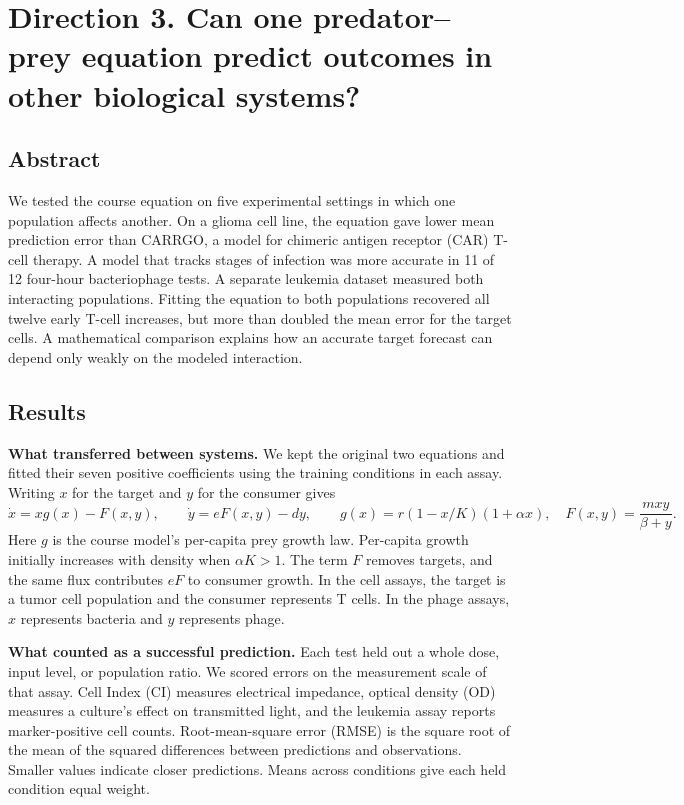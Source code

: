\section*{Direction 3. Can one predator--prey equation predict outcomes in other biological systems?}

\subsection*{Abstract}
We tested the course equation on five experimental settings in which one population affects another. On a glioma cell line, the equation gave lower mean prediction error than CARRGO, a model for chimeric antigen receptor (CAR) T-cell therapy. A model that tracks stages of infection was more accurate in 11 of 12 four-hour bacteriophage tests. A separate leukemia dataset measured both interacting populations. Fitting the equation to both populations recovered all twelve early T-cell increases, but more than doubled the mean error for the target cells. A mathematical comparison explains how an accurate target forecast can depend only weakly on the modeled interaction.

\subsection*{Results}
\textbf{What transferred between systems.}
We kept the original two equations and fitted their seven positive coefficients using the training conditions in each assay. Writing $x$ for the target and $y$ for the consumer gives
\[
 \dot x=xg(x)-F(x,y),\qquad \dot y=eF(x,y)-dy,\qquad
 g(x)=r(1-x/K)(1+\alpha x),\quad F(x,y)=\frac{mxy}{\beta+y}.
\]
Here $g$ is the course model's per-capita prey growth law. Per-capita growth initially increases with density when $\alpha K>1$. The term $F$ removes targets, and the same flux contributes $eF$ to consumer growth. In the cell assays, the target is a tumor cell population and the consumer represents T cells. In the phage assays, $x$ represents bacteria and $y$ represents phage.

\textbf{What counted as a successful prediction.}
Each test held out a whole dose, input level, or population ratio. We scored errors on the measurement scale of that assay. Cell Index (CI) measures electrical impedance, optical density (OD) measures a culture's effect on transmitted light, and the leukemia assay reports marker-positive cell counts. Root-mean-square error (RMSE) is the square root of the mean of the squared differences between predictions and observations. Smaller values indicate closer predictions. Means across conditions give each held condition equal weight.

